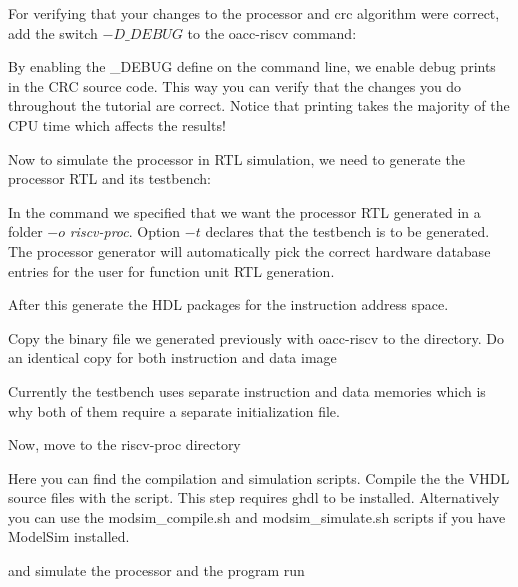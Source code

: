 \documentclass[a4paper,twoside]{tceusermanual}
\begin{document}
For verifying that your changes to the processor and crc algorithm were correct,
add the switch $-D\_DEBUG$ to the oacc-riscv command:


By enabling the \_DEBUG 
define on the command line, we enable debug prints in the CRC source code.
This way you can verify that the changes you do throughout the tutorial are correct.
Notice that printing takes the majority of the CPU time
which affects the results!

Now to simulate the processor in RTL simulation, we need to generate the
processor RTL and its testbench:


In the command we specified that we want the processor RTL generated in a
folder $-o$ \textit{riscv-proc}. Option $-t$ declares that the testbench 
is to be generated. The processor generator will automatically pick the
correct hardware database entries for the user for function unit RTL
generation.

After this generate the HDL packages for the instruction address space.


Copy the binary file we generated previously with oacc-riscv to the
 directory. Do an identical copy for both instruction
and data image



Currently the testbench uses separate instruction and data memories which is
why both of them require a separate initialization file.

Now, move to the riscv-proc directory


Here you can find the compilation and simulation scripts. Compile the the 
VHDL source files with the script. This step requires ghdl to be installed.
Alternatively you can use the modsim\_compile.sh and
modsim\_simulate.sh scripts if you have ModelSim installed.


and simulate the processor and the program run

\end{document}
